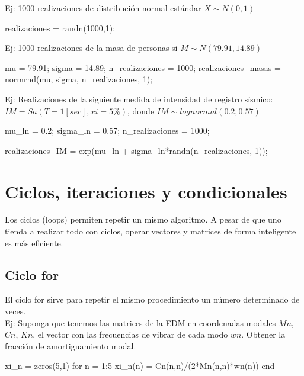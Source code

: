 Ej: 1000 realizaciones de distribución normal estándar $X \sim N(0,1)$
\begin{verbatimg}
    realizaciones = randn(1000,1); %
\end{verbatimg}

Ej: 1000 realizaciones de la masa de personas si $M \sim N(79.91, 14.89)$
\begin{verbatimg}
    mu = 79.91;                 %
    sigma = 14.89;              %
    n_realizaciones  = 1000;    %
    realizaciones_masas = normrnd(mu, sigma, n_realizaciones, 1); 
\end{verbatimg}

Ej: Realizaciones de la siguiente medida de intensidad de registro sísmico: $IM = Sa(T=1[sec], xi = 5\%)$, donde $IM \sim lognormal(0.2, 0.57)$
\begin{verbatimg}
    mu_ln = 0.2;            %
    sigma_ln = 0.57;        %
    n_realizaciones  = 1000;
    
    realizaciones_IM = exp(mu_ln + sigma_ln*randn(n_realizaciones, 1));
\end{verbatimg}

\section{Ciclos, iteraciones y condicionales}
Los ciclos (loops) permiten repetir un mismo algoritmo. A pesar de que uno tienda a realizar todo con ciclos, operar vectores y matrices de forma inteligente es más eficiente.

\subsection{Ciclo for}
El ciclo for sirve para repetir el mismo procedimiento un número determinado de veces. \\

Ej: Suponga que tenemos las matrices de la EDM en coordenadas modales $Mn$, $Cn$, $Kn$, el vector con las frecuencias de vibrar de cada modo $wn$. Obtener la fracción de amortiguamiento modal.
\begin{verbatimg}
    xi_n = zeros(5,1) %
    for n = 1:5 %
        xi_n(n) = Cn(n,n)/(2*Mn(n,n)*wn(n))
    end
\end{verbatimg}

